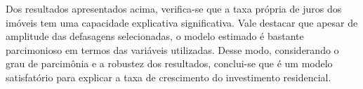 Dos resultados apresentados acima, verifica-se que a taxa própria de juros dos imóveis tem uma capacidade explicativa significativa. Vale destacar que apesar de amplitude das defasagens selecionadas, o modelo estimado é bastante parcimonioso em termos das variáveis utilizadas. Desse modo, considerando o grau de parcimônia e a robustez dos resultados, conclui-se que é um modelo satisfatório para explicar a taxa de crescimento do investimento residencial. 

